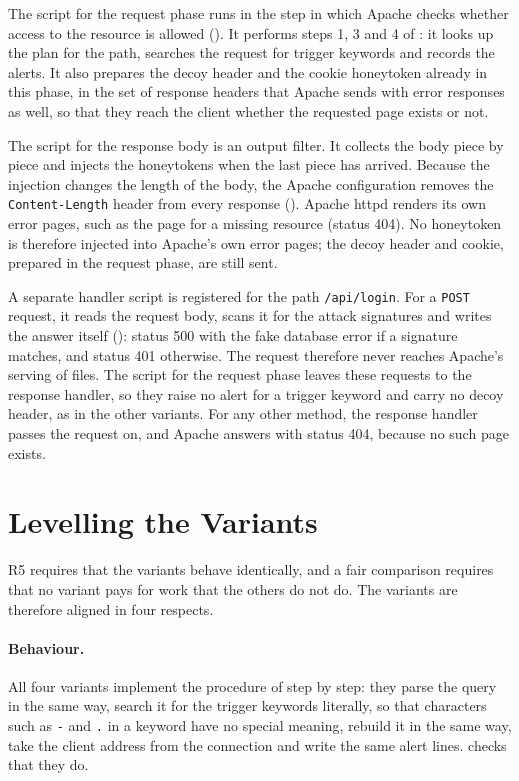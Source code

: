 \documentclass{rptuma}
\begin{document}
The script for the request phase runs in the step in which Apache checks
whether access to the resource is allowed (). It performs steps 1, 3
and 4 of : it looks up the plan for the path, searches the request
for trigger keywords and records the alerts. It also prepares the decoy header and the cookie
honeytoken already in this phase, in the set of response headers that Apache sends with error
responses as well, so that they reach the client whether the requested page exists or not.

The script for the response body is an output filter. It collects the body piece by piece and
injects the honeytokens when the last piece has arrived. Because the injection changes the length
of the body, the Apache configuration removes the \texttt{Content-Length} header from every
response (). Apache httpd renders its own error pages, such as
the page for a missing resource (status 404). No honeytoken is therefore injected into Apache's own error pages; the decoy header and
cookie, prepared in the request phase, are still sent.

A separate handler script is registered for the path
\texttt{/api/login}. For a \texttt{POST} request, it reads the request body, scans it for the attack
signatures and writes the answer itself (): status 500 with the fake
database error if a signature matches, and status 401 otherwise. The request therefore never
reaches Apache's serving of files. The script for the request phase leaves these requests to the
response handler, so they raise no alert for a trigger keyword and carry no decoy header, as in the other
variants. For any other method, the response handler passes the request on, and Apache answers with status
404, because no such page exists.

\section{Levelling the Variants}
\label{sec:AB.level}

R5 requires that the variants behave identically, and a fair comparison requires that no variant
pays for work that the others do not do. The variants are therefore aligned in four respects.

\paragraph{Behaviour.} All four variants implement the procedure of
 step by step: they parse the query in the same way, search it for
the trigger keywords literally, so that characters such as \texttt{-} and \texttt{.} in a keyword
have no special meaning, rebuild it in the same way, take the client address from the connection
and write the same alert lines.  checks that they do.
\end{document}
